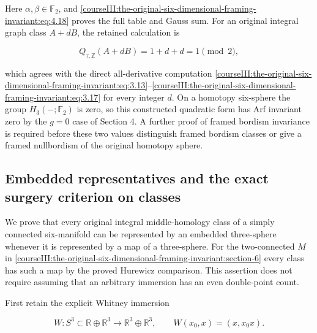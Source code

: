 Here \(\alpha,\beta\in\mathbb F_2\), and \eqref{courseIII:the-original-six-dimensional-framing-invariant:eq:4.18} proves the full table and Gauss sum. For an original integral graph class \(A+dB\), the retained calculation is

\begin{equation}
Q_{\tau,\mathbb Z}(A+dB)
          =1+d+d=1\pmod2,
 \label{courseIII:the-original-six-dimensional-framing-invariant:eq:6.25}
\end{equation}

which agrees with the direct all-derivative computation \eqref{courseIII:the-original-six-dimensional-framing-invariant:eq:3.13}--\eqref{courseIII:the-original-six-dimensional-framing-invariant:eq:3.17} for every integer \(d\). On a homotopy six-sphere the group \(H_3(-;\mathbb F_2)\) is zero, so this constructed quadratic form has Arf invariant zero by the \(g=0\) case of Section 4. A further proof of framed bordism invariance is required before these two values distinguish framed bordism classes or give a framed nullbordism of the original homotopy sphere.

\subsection{Embedded representatives and the exact surgery criterion on classes}
\label{courseIII:the-original-six-dimensional-framing-invariant:framed-six-embedded-representatives}

\label{courseIII:the-original-six-dimensional-framing-invariant:section-7}\label{courseIII:framed6:7}

We prove that every original integral middle-homology class of a simply connected six-manifold can be represented by an embedded three-sphere whenever it is represented by a map of a three-sphere. For the two-connected \(M\) in \cref{courseIII:the-original-six-dimensional-framing-invariant:section-6} every class has such a map by the proved Hurewicz comparison. This assertion does not require assuming that an arbitrary immersion has an even double-point count.

First retain the explicit Whitney immersion

\begin{equation}
W:S^3\subset\mathbb R\oplus\mathbb R^3\longrightarrow
           \mathbb R^3\oplus\mathbb R^3,\qquad
                 W(x_0,x)=(x,x_0x).
 \label{courseIII:the-original-six-dimensional-framing-invariant:eq:7.1}
\end{equation}


